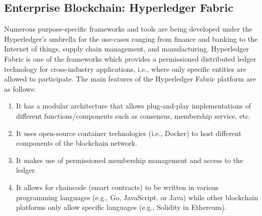 \subsection{Enterprise Blockchain: Hyperledger Fabric}
Numerous purpose-specific frameworks and tools are being developed under the Hyperledger's umbrella for the use-cases ranging from finance and banking to the Internet of things, supply chain management, and manufacturing.
Hyperledger Fabric is one of the frameworks which provides a permissioned distributed ledger technology for cross-industry applications, i.e., where only specific entities are allowed to participate. The main features of the Hyperledger Fabric platform are as follows:

\begin{enumerate}
    \item It has a modular architecture that allows plug-and-play implementations of different functions/components such as consensus, membership service, etc.
    \item It uses open-source container technologies (i.e., Docker) to host different components of the blockchain network.
    \item It makes use of permissioned membership management and access to the ledger.
    \item It allows for chaincode (smart contracts) to be written in various programming languages (e.g., Go, JavaScript, or Java) while other blockchain platforms only allow specific languages (e.g., Solidity in Ethereum).
\end{enumerate}



